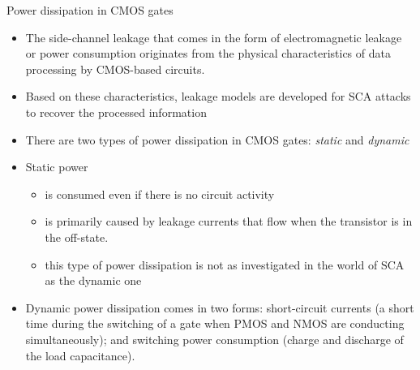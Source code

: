 \begin{frame}{Power dissipation in CMOS gates}
    \begin{itemize}
        \item The side-channel leakage that comes in the form of electromagnetic leakage or power consumption originates from the physical characteristics of data processing by CMOS-based circuits.
        \item Based on these characteristics, leakage models are developed for SCA attacks to recover the processed information
        \item There are two types of power dissipation in CMOS gates: \textit{static} and \textit{dynamic} 
        \item Static power
        \begin{itemize}
            \item is consumed even if there is no circuit activity
            \item is primarily caused by leakage currents that flow when the transistor is in the off-state.
            \item this type of power dissipation is not as investigated in the world of SCA as the dynamic one
        \end{itemize}
        \item Dynamic power dissipation comes in two forms: short-circuit currents (a short time during the switching of a gate when PMOS and NMOS are conducting simultaneously); and switching power consumption (charge and discharge of the load capacitance).
    \end{itemize}
\end{frame}

